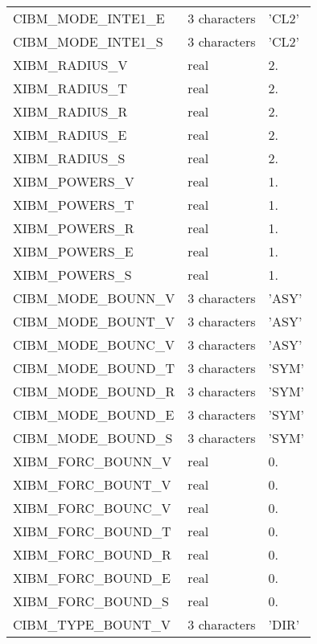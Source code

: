 \begin{longtable} {|p{}|p{}|p{}|}
CIBM\_MODE\_INTE1\_E & 3 characters  & 'CL2'         \\
CIBM\_MODE\_INTE1\_S & 3 characters  & 'CL2'         \\\hline
XIBM\_RADIUS\_V      & real          & 2.            \\
XIBM\_RADIUS\_T      & real          & 2.            \\
XIBM\_RADIUS\_R      & real          & 2.            \\
XIBM\_RADIUS\_E      & real          & 2.            \\\hline
XIBM\_RADIUS\_S      & real          & 2.            \\
XIBM\_POWERS\_V      & real          & 1.            \\
XIBM\_POWERS\_T      & real          & 1.            \\
XIBM\_POWERS\_R      & real          & 1.            \\
XIBM\_POWERS\_E      & real          & 1.            \\
XIBM\_POWERS\_S      & real          & 1.            \\\hline
CIBM\_MODE\_BOUNN\_V & 3 characters  & 'ASY'         \\
CIBM\_MODE\_BOUNT\_V & 3 characters  & 'ASY'         \\
CIBM\_MODE\_BOUNC\_V & 3 characters  & 'ASY'         \\
CIBM\_MODE\_BOUND\_T & 3 characters  & 'SYM'         \\
CIBM\_MODE\_BOUND\_R & 3 characters  & 'SYM'         \\
CIBM\_MODE\_BOUND\_E & 3 characters  & 'SYM'         \\
CIBM\_MODE\_BOUND\_S & 3 characters  & 'SYM'         \\\hline
XIBM\_FORC\_BOUNN\_V & real          & 0.            \\
XIBM\_FORC\_BOUNT\_V & real          & 0.            \\
XIBM\_FORC\_BOUNC\_V & real          & 0.            \\
XIBM\_FORC\_BOUND\_T & real          & 0.            \\
XIBM\_FORC\_BOUND\_R & real          & 0.            \\
XIBM\_FORC\_BOUND\_E & real          & 0.            \\
XIBM\_FORC\_BOUND\_S & real          & 0.            \\\hline
CIBM\_TYPE\_BOUNT\_V & 3 characters  & 'DIR'         \\

\end{longtable}
